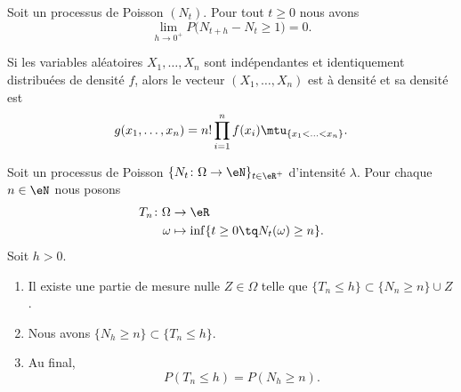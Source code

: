 \begin{proposition}   \label{PROPooGMBBooCIkVCB}
    Soit un processus de Poisson \( (N_t)\). Pour tout \( t\geq 0\) nous avons
    \begin{equation}
        \lim_{h\to 0^+} P\big( N_{t+h}-N_t\geq 1 \big)=0.
    \end{equation}
\end{proposition}

\begin{lemma}     \label{LEMooLNIZooDWUvRN}
    Si les variables aléatoires \( X_1,\ldots, X_n\) sont indépendantes et identiquement distribuées de densité \( f\), alors le vecteur \( (X_1,\ldots, X_n)\) est à densité et sa densité est
    \begin{equation}
        g(x_1,\ldots, x_n)=n!\prod_{i=1}^nf(x_i)\mtu_{\{ x_1<\ldots<x_n \}}.
    \end{equation}
\end{lemma}

\begin{lemma}        \label{LEMooXTVNooSBnnAd}
    Soit un processus de Poisson \(  \{ N_t\colon \Omega\to \eN \}_{t\in \eR^+}  \) d'intensité \( \lambda\). Pour chaque \( n\in \eN\) nous posons
    \begin{equation}
        \begin{aligned}
            T_n\colon \Omega&\to \eR \\
            \omega&\mapsto \inf\{ t\geq 0\tq N_t(\omega)\geq n \}. 
        \end{aligned}
    \end{equation}
    Soit \( h>0\). 
    \begin{enumerate}
        \item   \label{ITEMooXVSQooSQmIUv}
            Il existe une partie de mesure nulle \( Z\in \Omega\) telle que \( \{ T_n\leq h \}\subset \{ N_n\geq n \}\cup Z\).
        \item       \label{ITEMooIPKCooIfjUzS}
            Nous avons \( \{ N_h\geq n \}\subset \{ T_n\leq h \}\).
        \item
            Au final,
            \begin{equation}
                P(T_n\leq h)=P(N_h\geq n).
            \end{equation}
    \end{enumerate}
\end{lemma}

